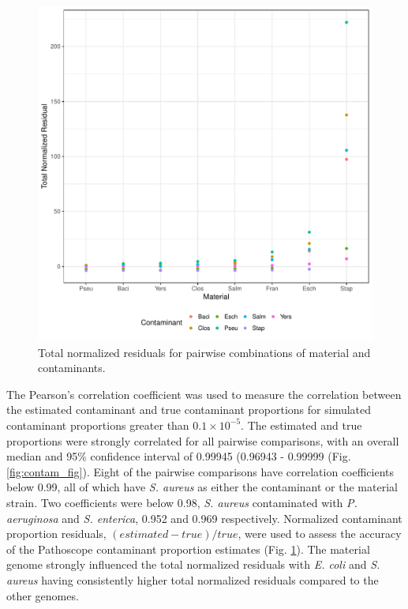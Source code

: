 \documentclass[fleqn,10pt,lineno]{wlpeerj}\usepackage[]{graphicx}\usepackage[]{color}
\makeatletter
\def\maxwidth{ %
  \ifdim\Gin@nat@width>\linewidth
    \linewidth
  \else
    \Gin@nat@width
  \fi
}
\newenvironment{knitrout}{}{} %
\makeatother
\begin{document}
\begin{knitrout}
\color{fgcolor}\begin{figure}
\includegraphics[width=\maxwidth]{figure/contam_resid-1} \caption[Total normalized residuals for pairwise combinations of material and contaminants]{Total normalized residuals for pairwise combinations of material and contaminants.}\label{fig:contam_resid}
\end{figure}


\end{knitrout}


The Pearson's correlation coefficient was used to measure the correlation between the estimated contaminant and true contaminant proportions for simulated contaminant proportions greater than $0.1\times 10^{-5}$. 
The estimated and true proportions were strongly correlated for all pairwise comparisons, with an overall median and 95\% confidence interval of 0.99945 (0.96943 - 0.99999 (Fig. \ref{fig:contam_fig}). 
Eight of the pairwise comparisons have correlation coefficients below 0.99, all of which have \textit{S. aureus} as either the contaminant or the material strain. 
Two coefficients were below 0.98, \textit{S. aureus} contaminated with \textit{P. aeruginosa} and \textit{S. enterica}, 0.952 and 0.969 respectively. 
Normalized contaminant proportion residuals, $(estimated-true)/true$, were used to assess the accuracy of the Pathoscope contaminant proportion estimates (Fig. \ref{fig:contam_resid}). 
The material genome strongly influenced the total normalized residuals with \textit{E. coli} and \textit{S. aureus} having consistently higher total normalized residuals compared to the other genomes. 
\end{document}
